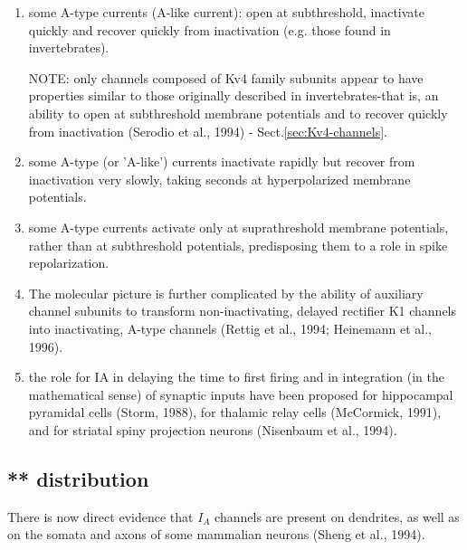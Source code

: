 \begin{enumerate}
  
  \item some A-type currents (A-like current): open at subthreshold, inactivate
  quickly and recover quickly from inactivation (e.g. those found in
  invertebrates).
  
NOTE: only channels composed of Kv4 family subunits appear to have properties
similar to those originally described in invertebrates-that is, an ability to
open at subthreshold membrane potentials and to recover quickly from
inactivation (Serodio et al., 1994) - Sect.\ref{sec:Kv4-channels}.

  \item  some A-type (or 'A-like') currents inactivate rapidly but recover from
inactivation very slowly, taking seconds at hyperpolarized membrane potentials. 


  \item some A-type currents activate only at suprathreshold membrane
  potentials, rather than at subthreshold potentials, predisposing them to a
  role in spike repolarization. 

  \item The molecular picture is further complicated by the ability of auxiliary
  channel subunits to transform non-inactivating, delayed rectifier K1 channels
  into inactivating, A-type channels (Rettig et al., 1994; Heinemann et al., 1996).

  \item the  role for IA in delaying the time to first firing and in integration
  (in the mathematical sense) of synaptic inputs have been proposed for hippocampal
pyramidal cells (Storm, 1988), for thalamic relay cells (McCormick, 1991), and
for striatal spiny projection neurons (Nisenbaum et al., 1994).
 
\end{enumerate}


\subsection{** distribution}

There is now direct evidence that $I_A$ channels are present on dendrites, as
well as on the somata and axons of some mammalian neurons (Sheng et al., 1994).




